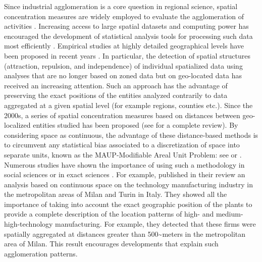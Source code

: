 \documentclass[fleqn,10pt]{latex/stylish_article} %
\begin{document}
Since industrial agglomeration is a core question in regional science, spatial concentration measures are widely employed to evaluate the agglomeration of activities \citep{Combes2004}.
Increasing access to large spatial datasets and computing power has encouraged the development of statistical analysis tools for processing such data most efficiently \citep{Baddeley2016}.
Empirical studies at highly detailed geographical levels have been proposed in recent years \citep[see for example][ or \citet{Baragwanath2026} based on satellite imagery]{Daspremont2025}.
In particular, the detection of spatial structures (attraction, repulsion, and independence) of individual spatialized data using analyses that are no longer based on zoned data but on geo-located data has received an increasing attention.
Such an approach has the advantage of preserving the exact positions of the entities analyzed contrarily to data aggregated at a given spatial level (for example regions, counties etc.).
Since the 2000s, a series of spatial concentration measures based on distances between geo-localized entities studied has been proposed (see \citet{Marcon2017} for a complete review).
By considering space as continuous, the advantage of these distance-based methods is to circumvent any statistical bias associated to a discretization of space into separate units, known as the MAUP-Modifiable Areal Unit Problem: see \citet{Openshaw1979} or \citet{Arbia1989}. Numerous studies have shown the importance of using such a methodology in social sciences \citep{Arbia1989, Marcon2003, Sweeney2022} or in exact sciences \citep{Cressie1993, Lentz2011, Dray2021}.
For example, \citet{Giuliani2014} published in their review an analysis based on continuous space on the technology manufacturing industry in the metropolitan areas of Milan and Turin in Italy.
They showed all the importance of taking into account the exact geographic position of the plants to provide a complete description of the location patterns of high- and medium-high-technology manufacturing.
For example, they detected that these firms were spatially aggregated at distances greater than 500\textasciitilde meters in the metropolitan area of Milan.
This result encourages developments that explain such agglomeration patterns.
\end{document}
